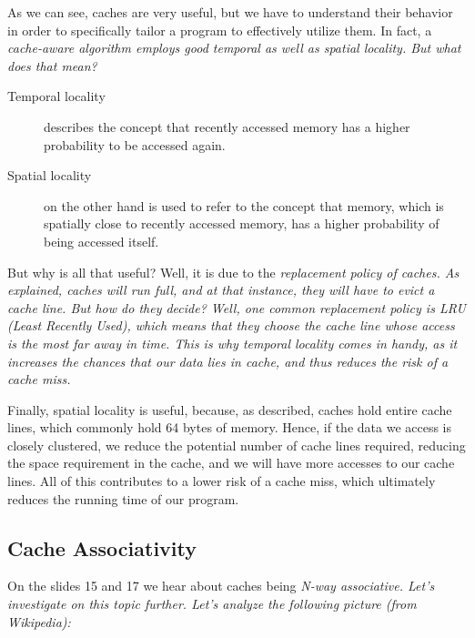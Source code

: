 \documentclass[../../main.tex]{subfiles}
\begin{document}
As we can see, caches are very useful, but we have to understand their behavior in order to specifically tailor a program to effectively utilize them. In fact, a \em cache-aware \em algorithm employs good temporal as well as spatial locality. But what does that mean?

\begin{description}
    \item[Temporal locality] describes the concept that recently accessed memory has a higher probability to be accessed again.
    \item[Spatial locality] on the other hand is used to refer to the concept that memory, which is spatially close to recently accessed memory, has a higher probability of being accessed itself.
\end{description}

\noindent
But why is all that useful? Well, it is due to the \em replacement policy \em of caches. As explained, caches will run full, and at that instance, they will have to evict a cache line. But how do they decide? Well, one common replacement policy is \em LRU (Least Recently Used)\em , which means that they choose the cache line whose access is the most far away in time. This is why temporal locality comes in handy, as it increases the chances that our data lies in cache, and thus reduces the risk of a cache miss.

Finally, spatial locality is useful, because, as described, caches hold entire cache lines, which commonly hold 64 bytes of memory. Hence, if the data we access is closely clustered, we reduce the potential number of cache lines required, reducing the space requirement in the cache, and we will have more accesses to our cache lines. All of this contributes to a lower risk of a cache miss, which ultimately reduces the running time of our program.

\bigskip
\subsection{Cache Associativity}
On the slides 15 and 17 we hear about caches being \em N-way associative\em . Let's investigate on this topic further. Let's analyze the following picture (from Wikipedia):
\end{document}
